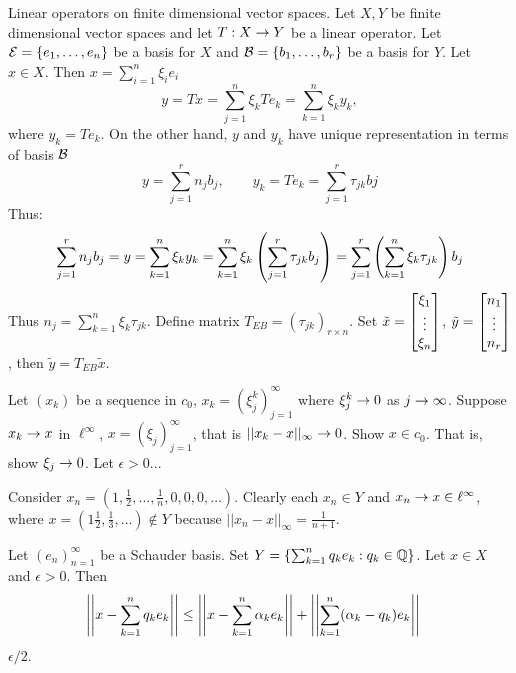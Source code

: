 \documentclass[]{article}
\begin{document}
Linear operators on finite dimensional vector spaces. 
Let $X,Y$ be finite dimensional vector spaces and let $T:X\rightarrow Y$ be a linear operator.
Let $\mathcal{E}=\left\{ e_1,\dots,e_n \right\}$ be a basis for $X$ and $\mathcal{B} = \left\{ b_1,\dots,b_r \right\}$ be a basis for $Y$.
Let $x\in X$. Then $x = \sum_{i=1}^n \xi_ie_i$
$$ y = Tx = \sum_{j=1}^n \xi_k Te_k = \sum_{k=1}^n \xi_ky_k, $$
where $y_k= Te_k$.
On the other hand, $y$ and $y_k$ have unique representation in terms of basis $\mathcal{B}$
$$ y = \sum_{j=1}^r n_jb_j, \qquad y_k = Te_k = \sum_{j=1}^r \tau_{jk}bj $$
Thus:
\begin{align*}
	\sum_{j=1}^r n_jb_j = y = \sum_{k=1}^n \xi_ky_k 
						= \sum_{k=1}^n \xi_k\left(\sum_{j=1}^r \tau_{jk}b_j\right) 
						= \sum_{j=1}^r \left(\sum_{k=1}^n \xi_k\tau_{jk}\right)b_j
\end{align*}
Thus $n_j = \sum_{k=1}^n \xi_k\tau_{jk}$.
Define matrix $T_{EB} = (\tau_{jk})_{r\times n}$.
Set $\tilde x = \begin{bmatrix}\xi_1\\\vdots\\\xi_n\end{bmatrix}$, $\tilde y = \begin{bmatrix}n_1\\\vdots\\n_r\end{bmatrix}$, then $\tilde y = T_{EB}\tilde x$.

\begin{example}
	[2.3-2] Let $(x_k)$ be a sequence in $c_0$, $x_k=(\xi_j^k)_{j=1}^\infty$ where $\xi_j^k\rightarrow0$ as $j\rightarrow\infty$.
	Suppose $x_k\rightarrow x$ in $\ell^\infty$, $x=(\xi_j)_{j=1}^\infty$, that is $||x_k-x||_\infty\rightarrow0$.
	Show $x\in c_0$. That is, show $\xi_j\rightarrow 0$.
	Let $\epsilon >0$...
\end{example}
\begin{example}
	[2.3-3]
	Consider $x_n = (1,\frac12,\dots,\frac1n,0,0,0,\dots)$.
	Clearly each $x_n\in Y$ and $x_n\rightarrow x\in\ell^\infty$, where $x = (1\frac12,\frac13,\dots)\notin Y$ because $||x_n-x||_\infty = \frac1{n+1}$.
\end{example}
\begin{example}
	[2.3-10] Let $(e_n)_{n=1}^\infty$ be a Schauder basis.
	Set $Y = \left\{ \sum_{k=1}^n q_ke_k : q_k\in\mathbb{Q} \right\}$. Let $x\in X$ and $\epsilon>0$.
	Then 
	\begin{align*}
		\left|\left|x-\sum_{k=1}^nq_ke_k\right|\right| &\leq \left|\left|x-\sum_{k=1}^n \alpha_ke_k\right|\right| + \left|\left|\sum_{k=1}^n(\alpha_k-q_k)e_k\right|\right|
	\end{align*}
	$\epsilon/2$.
\end{example}
\end{document}
